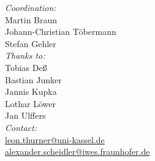 \begin{titlepage}
\textit{Coordination:}\\
Martin Braun \\
Johann-Christian Töbermann \\
Stefan Gehler \\[1em]

\textit{Thanks to:} \\
Tobias Deß \\
Bastian Junker\\
Jannis Kupka \\
Lothar Löwer \\
Jan Ulffers \\


\flushright
\textit{Contact:} \\
\href{mailto:leon.thurner@uni-kassel.de}{leon.thurner@uni-kassel.de} \\
\hspace{1cm} \href{mailto:alexander.scheidler@iwes.fraunhofer.de}{alexander.scheidler@iwes.fraunhofer.de}




\end{titlepage}